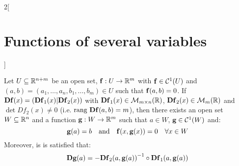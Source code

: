 \documentclass[../../../main.tex]{subfiles}
\begin{document}
\begin{multicols}{2}[\section{Functions of several variables}]
\begin{theorem}
        Let $U\subseteq\mathbb{R}^{n+m}$ be an open set, $\boldsymbol{\mathrm{f}}:U\rightarrow\mathbb{R}^m$ with $\boldsymbol{\mathrm{f}}\in \mathcal{C}^1(U)$ and $(a,b)=(a_1,\ldots,a_n,b_1,\ldots,b_m)\in U$ such that $\boldsymbol{\mathrm{f}}(a,b)=0$. If $\boldsymbol{\mathrm{D}}\boldsymbol{\mathrm{f}}(x)=(\boldsymbol{\mathrm{D}}\boldsymbol{\mathrm{f}}_1(x)|\boldsymbol{\mathrm{D}}\boldsymbol{\mathrm{f}}_2(x))$ with $\boldsymbol{\mathrm{D}}\boldsymbol{\mathrm{f}}_1(x)\in\mathcal{M}_{m\times n}(\mathbb{R} )$, $\boldsymbol{\mathrm{D}}\boldsymbol{\mathrm{f}}_2(x)\in\mathcal{M}_m(\mathbb{R} )$ and $\det Df_2(x)\ne 0$ (i.e. $\text{rang }\boldsymbol{\mathrm{Df}}(a,b)=m$), then there exists an open set $W\subseteq\mathbb{R}^n$ and a function $\boldsymbol{\mathrm{g}}:W\rightarrow\mathbb{R}^m$ such that $a\in W$, $\boldsymbol{\mathrm{g}}\in\mathcal{C}^1(W)$ and: $$\boldsymbol{\mathrm{g}}(a)=b\quad\text{and}\quad \boldsymbol{\mathrm{f}}(x,\boldsymbol{\mathrm{g}}(x))=0\quad\forall x\in W$$ Moreover, is is satisfied that: $$\boldsymbol{\mathrm{Dg}}(a)=-{\boldsymbol{\mathrm{Df}}_2(a,\boldsymbol{\mathrm{g}}(a))}^{-1}\circ \boldsymbol{\mathrm{Df}}_1(a,\boldsymbol{\mathrm{g}}(a))$$
    \end{theorem}

\end{multicols}
\end{document}
